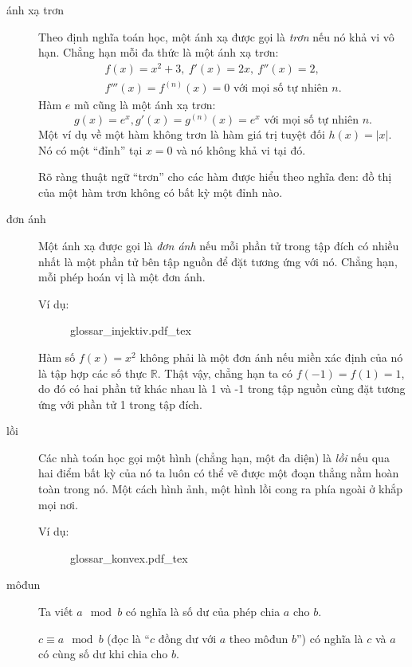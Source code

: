 \begin{description}
	\item[ánh xạ trơn] Theo định nghĩa toán học, một ánh xạ được gọi là \emph{trơn} nếu nó khả vi vô hạn. Chẳng hạn mỗi đa thức là một ánh xạ trơn:
			\begin{gather*}
				f(x) = x^2 + 3,\ f'(x) = 2x,\ f''(x) = 2,\\
				f'''(x) = f^{(n)}(x) = 0 \text{ với mọi số tự nhiên } n.
			\end{gather*}
			Hàm $e$ mũ cũng là một ánh xạ trơn: 
			\begin{equation*}
				g(x) = e^x, g'(x) = g^{(n)}(x) = e^x \text{ với mọi số tự nhiên } n.
			\end{equation*}
			Một ví dụ về một hàm không trơn là hàm giá trị tuyệt đối $h(x) = |x|.$ Nó có một \enquote{đỉnh} tại $x=0$ và nó không khả vi tại đó.

			Rõ ràng thuật ngữ \enquote{trơn} cho các hàm được hiểu theo nghĩa đen: đồ thị của một hàm trơn không có bất kỳ một đỉnh nào.

	\item[đơn ánh] Một ánh xạ được gọi là \emph{đơn ánh} nếu mỗi phần tử trong tập đích có nhiều nhất là một phần tử bên tập nguồn để đặt tương ứng với nó. Chẳng hạn, mỗi phép hoán vị là một đơn ánh. 

		Ví dụ:
		\begin{figure}
			\def\svgwidth{200pt} 
			{glossar_injektiv.pdf_tex} 
		\end{figure}
		Hàm số $f(x) = x^2$ không phải là một đơn ánh nếu miền xác định của nó là tập hợp các số thực $\mathbb R$. Thật vậy, chẳng hạn ta có $f(-1) = f(1) = 1$, do đó có hai phần tử khác nhau là 1 và -1 trong tập nguồn cùng đặt tương ứng với phần tử 1 trong tập đích.

	\item[lồi] Các nhà toán học gọi một hình (chẳng hạn, một đa diện) là \emph{lồi} nếu qua hai điểm bất kỳ của nó ta luôn có thể vẽ được một đoạn thẳng nằm hoàn toàn trong nó. Một cách hình ảnh, một hình lồi cong ra phía ngoài ở khắp mọi nơi.

		Ví dụ: 
		\begin{figure} 
			\def\svgwidth{270pt} 
			{glossar_konvex.pdf_tex} 
		\end{figure}

	\item[môđun] Ta viết $a \mod b$ có nghĩa là số dư của phép chia $a$ cho $b$. 

		$c\equiv a \mod b$ (đọc là \enquote{$c$ đồng dư với $a$ theo môđun $b$}) có nghĩa là $c$ và $a$ có cùng số dư khi chia cho $b$. 


\end{description}
